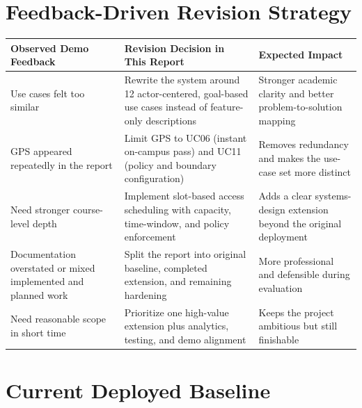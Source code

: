 \documentclass[12pt,letterpaper]{article}
\begin{document}
\section{Feedback-Driven Revision Strategy}

\begin{tabularx}{\textwidth}{@{}L{4.2cm}Y Y@{}}
\toprule
\textbf{Observed Demo Feedback} & \textbf{Revision Decision in This Report} & \textbf{Expected Impact} \\
\midrule
Use cases felt too similar & Rewrite the system around 12 actor-centered, goal-based use cases instead of feature-only descriptions & Stronger academic clarity and better problem-to-solution mapping \\
GPS appeared repeatedly in the report & Limit GPS to UC06 (instant on-campus pass) and UC11 (policy and boundary configuration) & Removes redundancy and makes the use-case set more distinct \\
Need stronger course-level depth & Implement slot-based access scheduling with capacity, time-window, and policy enforcement & Adds a clear systems-design extension beyond the original deployment \\
Documentation overstated or mixed implemented and planned work & Split the report into original baseline, completed extension, and remaining hardening & More professional and defensible during evaluation \\
Need reasonable scope in short time & Prioritize one high-value extension plus analytics, testing, and demo alignment & Keeps the project ambitious but still finishable \\
\bottomrule
\end{tabularx}

\section{Current Deployed Baseline}
\end{document}
